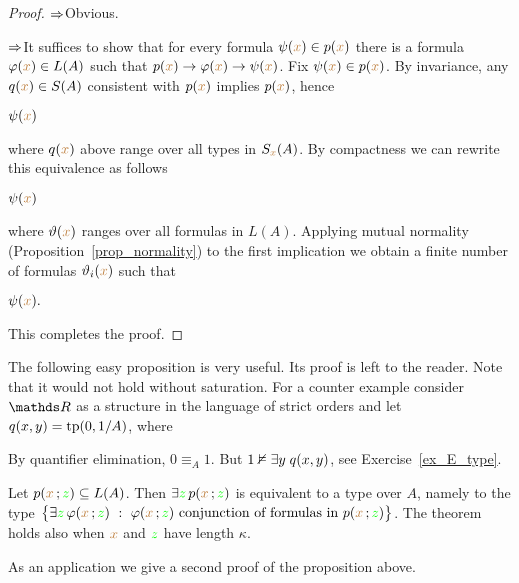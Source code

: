 \documentclass[creche.tex]{subfiles}
\begin{document}
\begin{proof}
$\Rightarrow$\quad Obvious. 

$\Rightarrow$\quad It suffices to show that for every formula $\psi({\color{brown} x})\in p({\color{brown} x})$ there is a formula $\varphi({\color{brown} x})\in L(A)$ such that $p({\color{brown} x})\rightarrow\varphi({\color{brown} x})\rightarrow\psi({\color{brown} x})$. Fix $\psi({\color{brown} x})\in p({\color{brown} x})$. By invariance, any $q({\color{brown} x})\in S(A)$ consistent with $p({\color{brown} x})$ implies $p({\color{brown} x})$, hence

\medrel{\imp}$\psi({\color{brown} x})$

where $q({\color{brown} x})$ above range over all types in $S_{\color{brown} x}(A)$. By compactness we can rewrite this equivalence as follows

\medrel{\imp}$\psi({\color{brown} x})$

where $\vartheta({\color{brown} x})$ ranges over all formulas in $L(A)$. Applying mutual normality (Proposition~\ref{prop_normality}) to the first implication we obtain a finite number of formulas $\vartheta_i({\color{brown} x})$ such that 

\medrel{\imp}$\psi({\color{brown} x}).$

This completes the proof.
\end{proof}

The following easy proposition is very useful. Its proof is left to the reader. Note that it would not hold without saturation. For a counter example consider $\RR$ as a structure in the language of strict orders and let $q(x,y)={\rm tp}(0,1/A)$, where 


By quantifier elimination, $0\equiv_{A}1$. But $1\nvDash\exists y\;q(x,y)$, see Exercise~\ref{ex_E_type}.


\begin{proposition}\label{prop_E_type}
Let $p({\color{brown} x}\,;{\color{green} z})\subseteq L(A)$. Then $\exists {\color{green}z}\,p({\color{brown} x}\,;{\color{green} z})$ is equivalent to a type over $A$, namely to the type $\big\{ \exists {\color{green}z}\,\varphi({\color{brown} x}\,;{\color{green} z})\ :\ \varphi({\color{brown} x}\,;{\color{green} z}) \textrm{ conjunction of formulas in } p({\color{brown} x}\,;{\color{green} z}) \big\}$. The theorem holds also when ${\color{brown} x}$ and ${\color{green} z}$ have length $\kappa$.\QED 
\end{proposition}

As an application we give a second proof of the proposition above.
\end{document}
